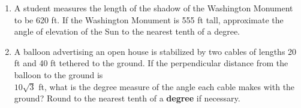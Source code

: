 \begin{enumerate}
\newpage



\newpage
\item A student measures the length of the shadow of the Washington Monument to be 620 ft. If the Washington Monument is 555 ft tall, approximate the angle of elevation of the Sun to the nearest tenth of a degree.
\vfill

\item A balloon advertising an open house is stabilized by two cables of lengths 20 ft and 40 ft tethered to the ground.  If the perpendicular distance from the balloon to the ground is \\$10\sqrt{3}$ ft, what is the degree measure of the angle each cable makes with the ground?  Round to the nearest tenth of a \textbf{degree} if necessary.
\vfill


\end{enumerate}
